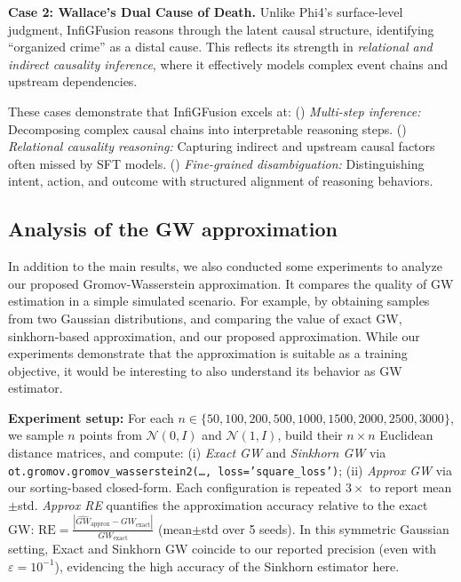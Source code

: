 \documentclass{article}
\begin{document}
\textbf{Case 2: Wallace's Dual Cause of Death.} Unlike Phi4's surface-level judgment, InfiGFusion reasons through the latent causal structure, identifying “organized crime” as a distal cause. This reflects its strength in \emph{relational and indirect causality inference}, where it effectively models complex event chains and upstream dependencies.

These cases demonstrate that InfiGFusion excels at: () \textit{Multi-step inference:} Decomposing complex causal chains into interpretable reasoning steps.
() \textit{Relational causality reasoning:} Capturing indirect and upstream causal factors often missed by SFT models.
() \textit{Fine-grained disambiguation:} Distinguishing intent, action, and outcome with structured alignment of reasoning behaviors.


\subsection{Analysis of the GW approximation}
\label{sec:Analysis of the GW approximation}
In addition to the main results, we also conducted some experiments to analyze our proposed Gromov-Wasserstein approximation. It compares the quality of GW estimation in a simple simulated scenario. For example, by obtaining samples from two Gaussian distributions, and comparing the value of exact GW, sinkhorn-based approximation, and our proposed approximation. While our experiments demonstrate that the approximation is suitable as a training objective, it would be interesting to also understand its behavior as GW estimator.

\textbf{Experiment setup:} For each $n\in\{50,100,200,500,1000,1500,2000,2500,3000\}$, we sample $n$ points from $\mathcal{N}(0,I)$ and $\mathcal{N}(1,I)$, build their $n\times n$ Euclidean distance matrices, and compute:
(i) \textit{Exact GW} and \textit{Sinkhorn GW} via \texttt{ot.gromov.gromov\_wasserstein2(\dots, loss='square\_loss')};
(ii) \textit{Approx GW} via our sorting-based closed-form.
Each configuration is repeated $3\times$ to report mean$\pm$std.
\textit{Approx RE} quantifies the approximation accuracy relative to the exact GW:
$\mathrm{RE}=\frac{|\widehat{GW}_{\text{approx}}-GW_{\text{exact}}|}{GW_{\text{exact}}}$ (mean$\pm$std over 5 seeds). 
In this symmetric Gaussian setting, Exact and Sinkhorn GW coincide to our reported precision (even with $\varepsilon=10^{-1}$), evidencing the high accuracy of the Sinkhorn estimator here.
\end{document}
